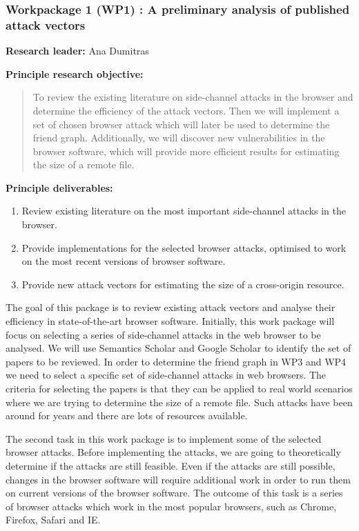 \documentclass[a4paper,11pt]{article}
\begin{document}
\subsubsection*{Workpackage 1 (WP1) : A preliminary analysis of published attack vectors}
\textbf{Research leader:} Ana Dumitras

\textbf{Principle research objective:}
\begin{quote}
	To review the existing literature on side-channel attacks in the browser and determine the efficiency of the attack vectors. Then we will implement a set of chosen browser attack which will later be used to determine the friend graph. Additionally, we will discover new vulnerabilities in the browser software, which will provide more efficient results for estimating the size of a remote file.
\end{quote}

\textbf{Principle deliverables:}
\begin{enumerate}
\item Review existing literature on the most important side-channel attacks in the browser.
\item Provide implementations for the selected browser attacks, optimised to work on the most recent versions of browser software. 
\item Provide new attack vectors for estimating the size of a cross-origin resource.
\end{enumerate}

The goal of this package is to review existing attack vectors and analyse their efficiency in state-of-the-art browser software. Initially, this work package will focus on selecting a series of side-channel attacks in the web browser to be analysed. We will use Semantics Scholar \cite{semanticsearch} and Google Scholar\cite{googlescholar} to identify the set of papers to be reviewed. In order to determine the friend graph in WP3 and WP4 we need to select a specific set of side-channel attacks in web browsers. The criteria for selecting the papers is that they can be applied to real world scenarios where we are trying to determine the size of a remote file. Such attacks have been around for years and there are lots of resources available. 

The second task in this work package is to implement some of the selected browser attacks. Before implementing the attacks, we are going to theoretically determine if the attacks are still feasible. Even if the attacks are still possible, changes in the browser software will require additional work in order to run them on current versions of the browser software. The outcome of this task is a series of browser attacks which work in the most popular browsers, such as Chrome, Firefox, Safari and IE. 
\end{document}
